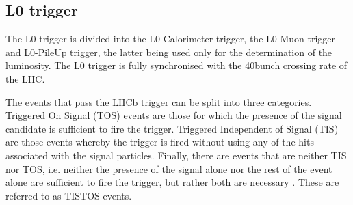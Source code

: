 \subsection{L0 trigger}
\label{sec:L0trig}
The L0 trigger is divided into the L0-Calorimeter trigger, the L0-Muon trigger and L0-PileUp trigger, the latter being used only for the determination of the luminosity. The L0 trigger is fully synchronised with the 40\mhz bunch crossing rate of the LHC.



The events that pass the LHCb trigger can be split into three categories. Triggered On Signal (\Gls{TOS}) events are those for which the presence of the signal candidate is sufficient to fire the trigger. Triggered Independent of Signal (\Gls{TIS}) are those events whereby the trigger is fired without using any of the hits associated with the signal particles. Finally, there are events that are neither TIS nor TOS, i.e. neither the presence of the signal alone nor the rest of the event alone are sufficient to fire the trigger, but rather both are necessary \cite{LHCb-PUB-2014-039}. These are referred to as \Gls{TISTOS} events.


